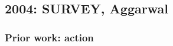 \subsection{2004: SURVEY, Aggarwal}
\begin{frame}
\frametitle{Prior work: action}
\framesubtitle{}
\mypagenum
{}
\end{frame}

\printbibliography

